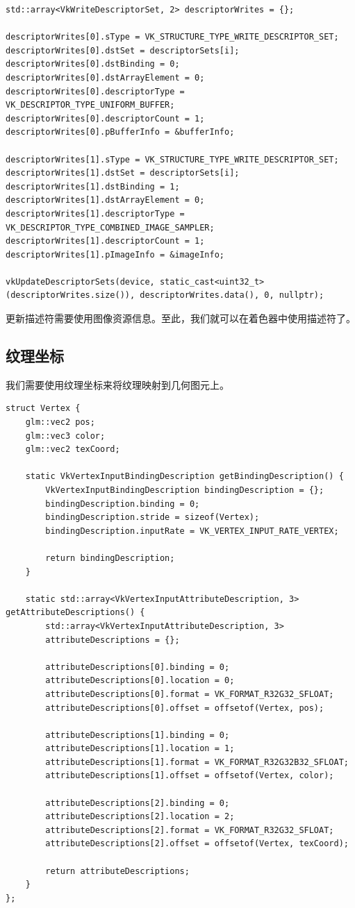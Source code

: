 \documentclass{ctexart}
\begin{document}
\begin{lstlisting}[language={[ANSI]C}]
std::array<VkWriteDescriptorSet, 2> descriptorWrites = {};

descriptorWrites[0].sType = VK_STRUCTURE_TYPE_WRITE_DESCRIPTOR_SET;
descriptorWrites[0].dstSet = descriptorSets[i];
descriptorWrites[0].dstBinding = 0;
descriptorWrites[0].dstArrayElement = 0;
descriptorWrites[0].descriptorType = VK_DESCRIPTOR_TYPE_UNIFORM_BUFFER;
descriptorWrites[0].descriptorCount = 1;
descriptorWrites[0].pBufferInfo = &bufferInfo;

descriptorWrites[1].sType = VK_STRUCTURE_TYPE_WRITE_DESCRIPTOR_SET;
descriptorWrites[1].dstSet = descriptorSets[i];
descriptorWrites[1].dstBinding = 1;
descriptorWrites[1].dstArrayElement = 0;
descriptorWrites[1].descriptorType = VK_DESCRIPTOR_TYPE_COMBINED_IMAGE_SAMPLER;
descriptorWrites[1].descriptorCount = 1;
descriptorWrites[1].pImageInfo = &imageInfo;

vkUpdateDescriptorSets(device, static_cast<uint32_t>(descriptorWrites.size()), descriptorWrites.data(), 0, nullptr);
\end{lstlisting}

更新描述符需要使用图像资源信息。至此，我们就可以在着色器中使用描述符了。

\subsection{纹理坐标}

我们需要使用纹理坐标来将纹理映射到几何图元上。

\begin{lstlisting}[language={[ANSI]C}]
struct Vertex {
	glm::vec2 pos;
	glm::vec3 color;
	glm::vec2 texCoord;

	static VkVertexInputBindingDescription getBindingDescription() {
		VkVertexInputBindingDescription bindingDescription = {};
		bindingDescription.binding = 0;
		bindingDescription.stride = sizeof(Vertex);
		bindingDescription.inputRate = VK_VERTEX_INPUT_RATE_VERTEX;

		return bindingDescription;
	}

	static std::array<VkVertexInputAttributeDescription, 3> getAttributeDescriptions() {
		std::array<VkVertexInputAttributeDescription, 3>
		attributeDescriptions = {};

		attributeDescriptions[0].binding = 0;
		attributeDescriptions[0].location = 0;
		attributeDescriptions[0].format = VK_FORMAT_R32G32_SFLOAT;
		attributeDescriptions[0].offset = offsetof(Vertex, pos);

		attributeDescriptions[1].binding = 0;
		attributeDescriptions[1].location = 1;
		attributeDescriptions[1].format = VK_FORMAT_R32G32B32_SFLOAT;
		attributeDescriptions[1].offset = offsetof(Vertex, color);

		attributeDescriptions[2].binding = 0;
		attributeDescriptions[2].location = 2;
		attributeDescriptions[2].format = VK_FORMAT_R32G32_SFLOAT;
		attributeDescriptions[2].offset = offsetof(Vertex, texCoord);

		return attributeDescriptions;
	}
};
\end{lstlisting}
\end{document}
